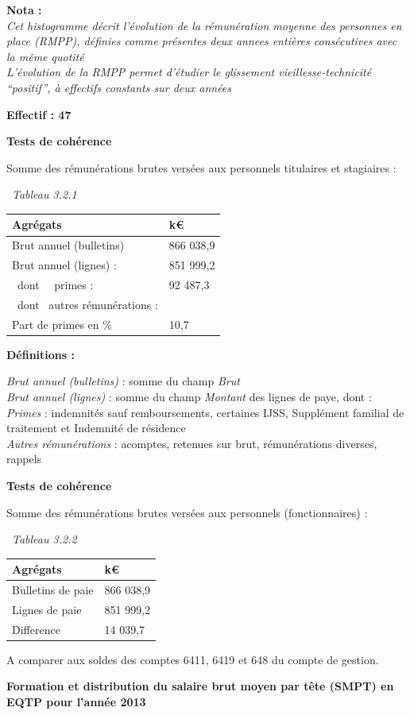 \textbf{Nota :}\\
\emph{Cet histogramme décrit l'évolution de la rémunération moyenne des
personnes en place (RMPP), définies comme présentes deux annees entières
consécutives avec la même quotité}\\
\emph{L'évolution de la RMPP permet d'étudier le glissement
vieillesse-technicité ``positif'', à effectifs constants sur deux
années}

\textbf{Effectif : 47 }

\textbf{Tests de cohérence}

Somme des rémunérations brutes versées aux personnels titulaires et
stagiaires :

~\emph{Tableau 3.2.1}

\begin{longtable}[]{@{}ll@{}}
\toprule
Agrégats & k€\tabularnewline
\midrule
\endhead
Brut annuel (bulletins) & 866 038,9\tabularnewline
Brut annuel (lignes) : & 851 999,2\tabularnewline
~dont ~~primes : & 92 487,3\tabularnewline
~dont ~autres rémunérations : &\tabularnewline
Part de primes en \% & 10,7\tabularnewline
\bottomrule
\end{longtable}

\textbf{Définitions :}

\emph{Brut annuel (bulletins)} : somme du champ \emph{Brut}\\
\emph{Brut annuel (lignes)} : somme du champ \emph{Montant} des lignes
de paye, dont :\\
\emph{Primes} : indemnités sauf remboursements, certaines IJSS,
Supplément familial de traitement et Indemnité de résidence\\
\emph{Autres rémunérations} : acomptes, retenues sur brut, rémunérations
diverses, rappels

\textbf{Tests de cohérence}

Somme des rémunérations brutes versées aux personnels (fonctionnaires) :

~\emph{Tableau 3.2.2}

\begin{longtable}[]{@{}ll@{}}
\toprule
Agrégats & k€\tabularnewline
\midrule
\endhead
Bulletins de paie & 866 038,9\tabularnewline
Lignes de paie & 851 999,2\tabularnewline
Difference & 14 039,7\tabularnewline
\bottomrule
\end{longtable}

A comparer aux soldes des comptes 6411, 6419 et 648 du compte de
gestion.

\textbf{Formation et distribution du salaire brut moyen par tête (SMPT)
en EQTP pour l'année 2013 }

